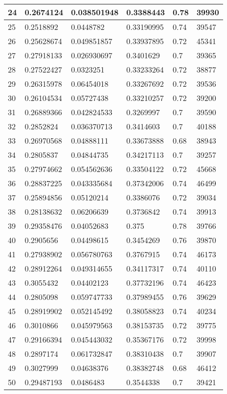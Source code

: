 \begin{longtable}{|l|l|l|l|l|l|}
24 & 0.2674124 & 0.038501948 & 0.3388443 & 0.78 & 39930 \\ \hline 
25 & 0.2518892 & 0.0448782 & 0.33190995 & 0.74 & 39547 \\ \hline 
26 & 0.25628674 & 0.049851857 & 0.33937895 & 0.72 & 45341 \\ \hline 
27 & 0.27918133 & 0.026930697 & 0.3401629 & 0.7 & 39365 \\ \hline 
28 & 0.27522427 & 0.0323251 & 0.33233264 & 0.72 & 38877 \\ \hline 
29 & 0.26315978 & 0.06454018 & 0.33267692 & 0.72 & 39536 \\ \hline 
30 & 0.26104534 & 0.05727438 & 0.33210257 & 0.72 & 39200 \\ \hline 
31 & 0.26889366 & 0.042824533 & 0.3269997 & 0.7 & 39590 \\ \hline 
32 & 0.2852824 & 0.036370713 & 0.3414603 & 0.7 & 40188 \\ \hline 
33 & 0.26970568 & 0.04888111 & 0.33673888 & 0.68 & 38943 \\ \hline 
34 & 0.2805837 & 0.04844735 & 0.34217113 & 0.7 & 39257 \\ \hline 
35 & 0.27974662 & 0.054562636 & 0.33504122 & 0.72 & 45668 \\ \hline 
36 & 0.28837225 & 0.043335684 & 0.37342006 & 0.74 & 46499 \\ \hline 
37 & 0.25894856 & 0.05120214 & 0.3386076 & 0.72 & 39034 \\ \hline 
38 & 0.28138632 & 0.06206639 & 0.3736842 & 0.74 & 39913 \\ \hline 
39 & 0.29358476 & 0.04052683 & 0.375 & 0.78 & 39766 \\ \hline 
40 & 0.2905656 & 0.04498615 & 0.3454269 & 0.76 & 39870 \\ \hline 
41 & 0.27938902 & 0.056780763 & 0.3767915 & 0.74 & 46173 \\ \hline 
42 & 0.28912264 & 0.049314655 & 0.34117317 & 0.74 & 40110 \\ \hline 
43 & 0.3055432 & 0.04402123 & 0.37732196 & 0.74 & 46423 \\ \hline 
44 & 0.2805098 & 0.059747733 & 0.37989455 & 0.76 & 39629 \\ \hline 
45 & 0.28919902 & 0.052145492 & 0.38058823 & 0.74 & 40234 \\ \hline 
46 & 0.3010866 & 0.045979563 & 0.38153735 & 0.72 & 39775 \\ \hline 
47 & 0.29166394 & 0.045443032 & 0.35367176 & 0.72 & 39998 \\ \hline 
48 & 0.2897174 & 0.061732847 & 0.38310438 & 0.7 & 39907 \\ \hline 
49 & 0.3027999 & 0.04638376 & 0.38382748 & 0.68 & 46412 \\ \hline 
50 & 0.29487193 & 0.0486483 & 0.3544338 & 0.7 & 39421 \\ \hline 
\end{longtable}